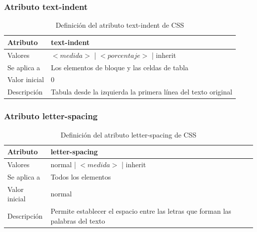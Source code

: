 \documentclass[ucs]{beamer}
\begin{document}
\begin{frame}
\frametitle{Atributo text-indent}

\begin{center}
  \begin{table}
   \begin{tabular}{p{1.8cm}p{7.8cm}}
Atributo & \bf{text-indent} \\ \hline
Valores& $<medida>$ | $<porcentaje>$ | inherit \\ \hline
Se aplica a& Los elementos de bloque y las celdas de tabla \\ \hline
Valor inicial& 0 \\ \hline
Descripción& Tabula desde la izquierda la primera línea del texto original \\ \hline
  \end{tabular}
   \caption{Definición del atributo text-indent de CSS}
 \end{table}
\end{center}


\end{frame}



\begin{frame}
\frametitle{Atributo letter-spacing}

\begin{center}
  \begin{table}
   \begin{tabular}{p{1.8cm}p{7.8cm}}
Atributo & \bf{letter-spacing} \\ \hline
Valores& normal | $<medida>$ | inherit \\ \hline
Se aplica a& Todos los elementos \\ \hline
Valor inicial& normal \\ \hline
Descripción& Permite establecer el espacio entre las letras que forman las palabras del texto \\ \hline
  \end{tabular}
   \caption{Definición del atributo letter-spacing de CSS}
 \end{table}
\end{center}


\end{frame}


\end{document}
